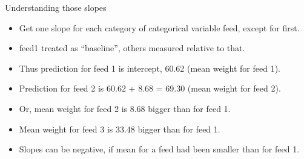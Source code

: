 \documentclass[ignorenonframetext,]{beamer}
\providecommand{\tightlist}{%
  \setlength{\itemsep}{0pt}\setlength{\parskip}{0pt}}
\begin{document}
\begin{frame}{Understanding those slopes}
\protect\hypertarget{understanding-those-slopes}{}

\begin{itemize}
\tightlist
\item
  Get one slope for each category of categorical variable feed, except
  for first.
\item
  feed1 treated as ``baseline'', others measured relative to that.
\item
  Thus prediction for feed 1 is intercept, 60.62 (mean weight for feed
  1).
\item
  Prediction for feed 2 is 60.62 + 8.68 = 69.30 (mean weight for feed
  2).
\item
  Or, mean weight for feed 2 is 8.68 bigger than for feed 1.
\item
  Mean weight for feed 3 is 33.48 bigger than for feed 1.
\item
  Slopes can be negative, if mean for a feed had been smaller than for
  feed 1.
\end{itemize}

\end{frame}
\end{document}
